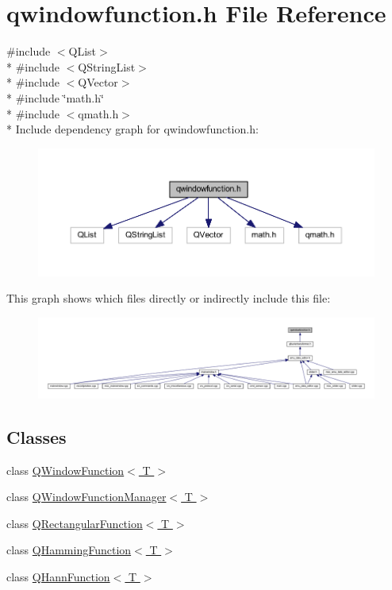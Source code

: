 \hypertarget{a00128}{\section{qwindowfunction.\+h File Reference}
\label{a00128}
}
{\ttfamily \#include $<$Q\+List$>$}\\*
{\ttfamily \#include $<$Q\+String\+List$>$}\\*
{\ttfamily \#include $<$Q\+Vector$>$}\\*
{\ttfamily \#include \char`\"{}math.\+h\char`\"{}}\\*
{\ttfamily \#include $<$qmath.\+h$>$}\\*
Include dependency graph for qwindowfunction.\+h\+:
\nopagebreak
\begin{figure}[H]
\begin{center}
\leavevmode
\includegraphics[width=350pt]{dc/d84/a00338}
\end{center}
\end{figure}
This graph shows which files directly or indirectly include this file\+:
\nopagebreak
\begin{figure}[H]
\begin{center}
\leavevmode
\includegraphics[width=350pt]{d0/d01/a00339}
\end{center}
\end{figure}
\subsection*{Classes}
\begin{DoxyCompactItemize}
\item 
class \hyperlink{a00071}{Q\+Window\+Function$<$ T $>$}
\item 
class \hyperlink{a00072}{Q\+Window\+Function\+Manager$<$ T $>$}
\item 
class \hyperlink{a00062}{Q\+Rectangular\+Function$<$ T $>$}
\item 
class \hyperlink{a00056}{Q\+Hamming\+Function$<$ T $>$}
\item 
class \hyperlink{a00057}{Q\+Hann\+Function$<$ T $>$}
\end{DoxyCompactItemize}
